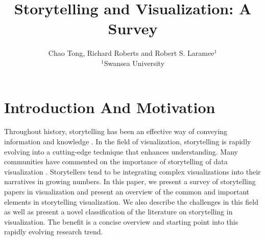 \documentclass{egpubl}
\begin{document}
\title[Storytelling and Visualization: A Survey]%
      {Storytelling and Visualization: A Survey}

\author[C.Tong \& R.Roberts \& R.S.Laramee]
       {Chao Tong, Richard Roberts
        and Robert S. Laramee$^{1}$
        \\
        $^1$Swansea University
       }

\maketitle
\tableofcontents
\section{Introduction And Motivation}

Throughout history, storytelling has been an effective way of conveying information and knowledge \cite{Lidal2013}. In the field of visualization, storytelling is rapidly evolving into a cutting-edge technique that enhances understanding. Many communities have commented on the importance of storytelling of data visualization \cite{segal}. Storytellers tend to be integrating complex visualizations into their narratives in growing numbers. In this paper, we present a survey of storytelling papers in visualization and present an overview of the common and important elements in storytelling visualization. We also describe the challenges in this field as well as present a novel classification of the literature on storytelling in visualization. The benefit is a concise overview and starting point into this rapidly evolving research trend. 
\end{document}
